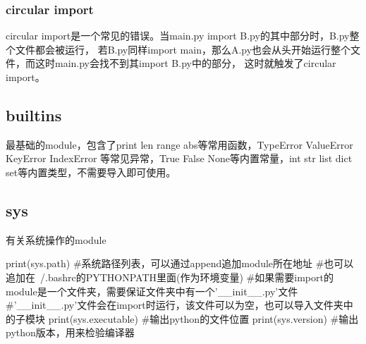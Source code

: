     \subsubsection{circular import}
      circular import是一个常见的错误。当main.py import B.py的其中部分时，B.py整个文件都会被运行，
      若B.py同样import main，那么A.py也会从头开始运行整个文件，而这时main.py会找不到其import B.py中的部分，
      这时就触发了circular import。

  \subsection{builtins}
    最基础的module，包含了print len range abs等常用函数，TypeError ValueError KeyError IndexError
    等常见异常，True False None等内置常量，int str list dict set等内置类型，不需要导入即可使用。

  \subsection{sys}
    有关系统操作的module
    \begin{codeblock}[language=python, caption={sys module}]
      print(sys.path)
      #系统路径列表，可以通过append追加module所在地址
      #也可以追加在~/.bashrc的PYTHONPATH里面(作为环境变量)
      #如果需要import的module是一个文件夹，需要保证文件夹中有一个'\_\_init\_\_.py'文件
      #'\_\_init\_\_.py'文件会在import时运行，该文件可以为空，也可以导入文件夹中的子模块
      print(sys.executable) #输出python的文件位置
      print(sys.version) #输出python版本，用来检验编译器
    \end{codeblock}

